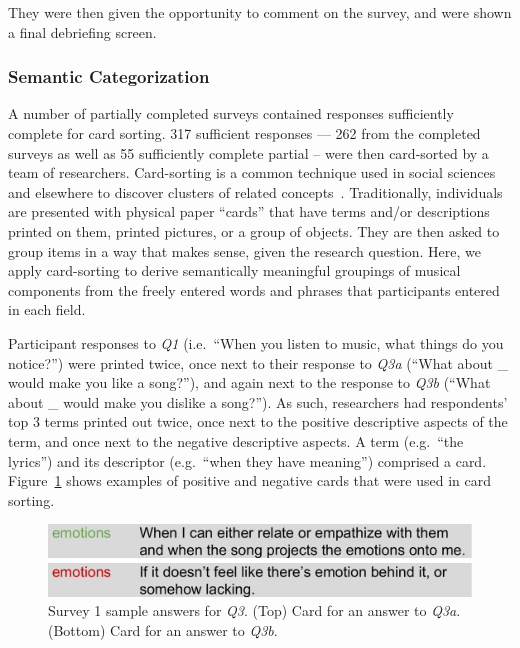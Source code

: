 \documentclass{article}
\begin{document}
They were then given the opportunity to comment on the survey, and were shown a final debriefing screen.

\subsubsection{Semantic Categorization}
A number of partially completed surveys contained responses sufficiently complete for card sorting. 317 sufficient responses --- 262 from the completed surveys as well as 55 sufficiently complete partial -- were then card-sorted by a team of researchers.
Card-sorting is a common technique used in social sciences and elsewhere to discover clusters of related concepts~\cite{miller1969psychological}.
Traditionally, individuals are presented with physical paper ``cards'' that have terms and/or descriptions printed on them, printed pictures, or a group of objects.
They are then asked to group items in a way that makes sense, given the research question. Here, we apply card-sorting to derive semantically meaningful groupings of musical components from the freely entered words and phrases that participants entered in each field.

Participant responses to \emph{Q1} (i.e.~``When you listen to music, what things do you notice?'') were printed twice, once next to their response to \emph{Q3a} (``What about \_ would make you like a song?''), and again next to the response to \emph{Q3b} (``What about \_ would make you dislike a song?''). As such, researchers had respondents' top 3 terms printed out twice, once next to the positive descriptive aspects of the term, and once next to the negative descriptive aspects.
A term (e.g.~``the lyrics'') and its descriptor (e.g.~``when they have meaning'') comprised a card. Figure~\ref{fig:card-examples} shows examples of positive and negative cards that were used in card sorting.

\begin{figure}
\begin{center}
\includegraphics[width=\columnwidth]{figs/cards.pdf}
\end{center}
\caption{Survey 1 sample answers for \emph{Q3}. (Top) Card for an answer to \emph{Q3a}. (Bottom) Card for an answer to \emph{Q3b}.}
\label{fig:card-examples}
\end{figure}
\end{document}
